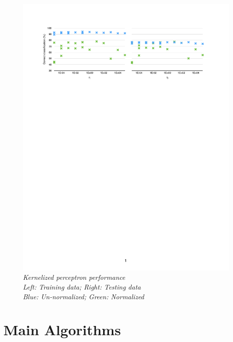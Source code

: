 \documentclass          {article} %
\begin{document}
\begin                  {figure}
\begin                  {center}
\includegraphics        [scale = 0.6]
                        {fig1.pdf}
\caption                {\small\textit{Kernelized perceptron performance\\Left: Training data; Right: Testing data\\Blue: Un-normalized; Green: Normalized}}
\label                  {fig:fig1}
\end                    {center}
\end                    {figure}


\section                {Main Algorithms}
\label                  {sec:main_algorithms}
\end{document}
